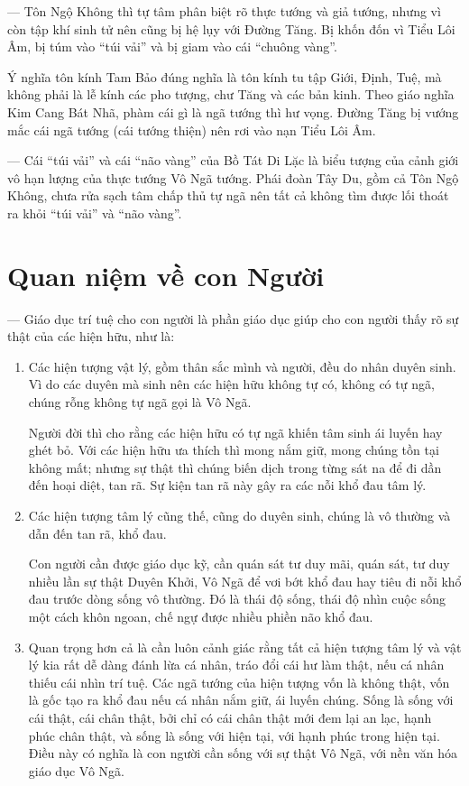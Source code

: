 — Tôn Ngộ Không thì tự tâm phân biệt rõ thực tướng và giả tướng, nhưng vì còn tập khí sinh tử nên cũng bị hệ lụy với Đường Tăng. Bị khốn đốn vì Tiểu Lôi Âm, bị túm vào ``túi vải'' và bị giam vào cái ``chuông vàng''.

Ý nghĩa tôn kính Tam Bảo đúng nghĩa là tôn kính tu tập Giới, Định, Tuệ, mà không phải là lễ kính các pho tượng, chư Tăng và các bản kinh. Theo giáo nghĩa Kim Cang Bát Nhã, phàm cái gì là ngã tướng thì hư vọng. Đường Tăng bị vướng mắc cái ngã tướng (cái tướng thiện) nên rơi vào nạn Tiểu Lôi Âm.

— Cái ``túi vải'' và cái ``não vàng'' của Bồ Tát Di Lặc là biểu tượng của cảnh giới vô hạn lượng của thực tướng Vô Ngã tướng. Phái đoàn Tây Du, gồm cả Tôn Ngộ Không, chưa rửa sạch tâm chấp thủ tự ngã nên tất cả không tìm được lối thoát ra khỏi ``túi vải'' và ``não vàng''.

\section{Quan niệm về con Người} %
\label{sec:65_66_con_nguoi}

— Giáo dục trí tuệ cho con người là phần giáo dục giúp cho con người thấy rõ sự thật của các hiện hữu, như là:

\begin{enumerate}[label=\itshape\alph*\upshape)]
    \item Các hiện tượng vật lý, gồm thân sắc mình và người, đều do nhân duyên sinh. Vì do các duyên mà sinh nên các hiện hữu không tự có, không có tự ngã, chúng rỗng không tự ngã gọi là Vô Ngã.

    Người đời thì cho rằng các hiện hữu có tự ngã khiến tâm sinh ái luyến hay ghét bỏ. Với các hiện hữu ưa thích thì mong nắm giữ, mong chúng tồn tại không mất; nhưng sự thật thì chúng biến dịch trong từng sát na để đi dần đến hoại diệt, tan rã. Sự kiện tan rã này gây ra các nỗi khổ đau tâm lý.

    \item Các hiện tượng tâm lý cũng thế, cũng do duyên sinh, chúng là vô thường và dẫn đến tan rã, khổ đau.

    Con người cần được giáo dục kỹ, cần quán sát tư duy mãi, quán sát, tư duy nhiều lần sự thật Duyên Khởi, Vô Ngã để vơi bớt khổ đau hay tiêu đi nỗi khổ đau trước dòng sống vô thường. Đó là thái độ sống, thái độ nhìn cuộc sống một cách khôn ngoan, chế ngự được nhiều phiền não khổ đau.

    \item Quan trọng hơn cả là cần luôn cảnh giác rằng tất cả hiện tượng tâm lý và vật lý kia rất dễ dàng đánh lừa cá nhân, tráo đổi cái hư làm thật, nếu cá nhân thiếu cái nhìn trí tuệ. Các ngã tướng của hiện tượng vốn là không thật, vốn là gốc tạo ra khổ đau nếu cá nhân nắm giữ, ái luyến chúng. Sống là sống với cái thật, cái chân thật, bởi chỉ có cái chân thật mới đem lại an lạc, hạnh phúc chân thật, và sống là sống với hiện tại, với hạnh phúc trong hiện tại. Điều này có nghĩa là con người cần sống với sự thật Vô Ngã, với nền văn hóa giáo dục Vô Ngã.
\end{enumerate}

